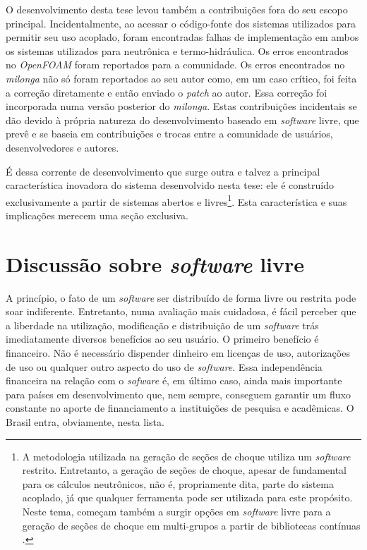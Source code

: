 O desenvolvimento desta tese levou também a contribuições fora do seu escopo principal.
Incidentalmente, ao acessar o código-fonte dos sistemas utilizados para permitir seu
uso acoplado, foram encontradas
falhas de implementação em ambos os sistemas utilizados para neutrônica e termo-hidráulica.
Os erros encontrados no \textit{OpenFOAM} foram reportados para a comunidade.
Os erros encontrados no \textit{milonga} não só foram reportados ao seu autor como,
em um caso crítico, foi feita a correção diretamente e então enviado o \textit{patch} ao autor.
Essa correção foi incorporada numa versão posterior do \textit{milonga}.
Estas contribuições incidentais se dão devido à própria natureza do desenvolvimento baseado
em \textit{software} livre, que prevê e se baseia em contribuições e trocas entre a comunidade
de usuários, desenvolvedores e autores.

É dessa corrente de desenvolvimento que surge outra e talvez a principal característica inovadora
do sistema desenvolvido nesta tese: ele é construído exclusivamente a partir
de sistemas abertos e livres\footnote{A metodologia utilizada
  na geração de seções de choque utiliza um \textit{software} restrito. Entretanto, a geração
  de seções de choque, apesar de fundamental para os cálculos neutrônicos, não é, propriamente dita,
  parte do sistema acoplado, já que qualquer ferramenta pode ser utilizada para este propósito. Neste tema, começam também a surgir opções em \textit{software} livre
  para a geração de seções de choque em multi-grupos a partir de bibliotecas contínuas \cite{Slaybaugh2014}.}.
Esta característica e suas implicações merecem uma seção exclusiva.


\section{Discussão sobre \textit{software} livre}

A princípio, o fato de um \textit{software} ser distribuído de forma livre ou restrita pode soar indiferente.
Entretanto, numa avaliação mais cuidadosa, é fácil
perceber que a liberdade na utilização, modificação e distribuição de um \textit{software} trás imediatamente
diversos benefícios ao seu usuário. O primeiro
benefício é financeiro. Não é necessário dispender dinheiro em licenças de uso, autorizações de uso ou
qualquer outro aspecto do uso de \textit{software}. Essa independência financeira na relação com o \textit{sofware} é, em último caso,
ainda mais importante para países em desenvolvimento que, nem sempre, conseguem garantir um fluxo constante
no aporte de financiamento a instituições de pesquisa e acadêmicas. O Brasil entra, obviamente, nesta lista.

